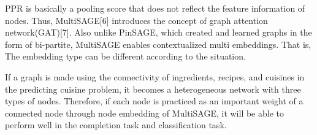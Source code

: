 PPR is basically a pooling score that does not reflect the feature information of nodes. Thus, MultiSAGE[6] introduces the concept of graph attention network(GAT)[7]. Also unlike PinSAGE,  which created and learned graphs in the form of bi-partite, MultiSAGE enables contextualized multi embeddings. That is, The embedding type can be different according to the situation.

If a graph is made using the connectivity of ingredients, recipes, and cuisines in the predicting cuisine problem, it becomes a heterogeneous network with three types of nodes. 
Therefore, if each node is practiced as an important weight of a connected node through node embedding of MultiSAGE, it will be able to perform well in the completion task and classification task.

